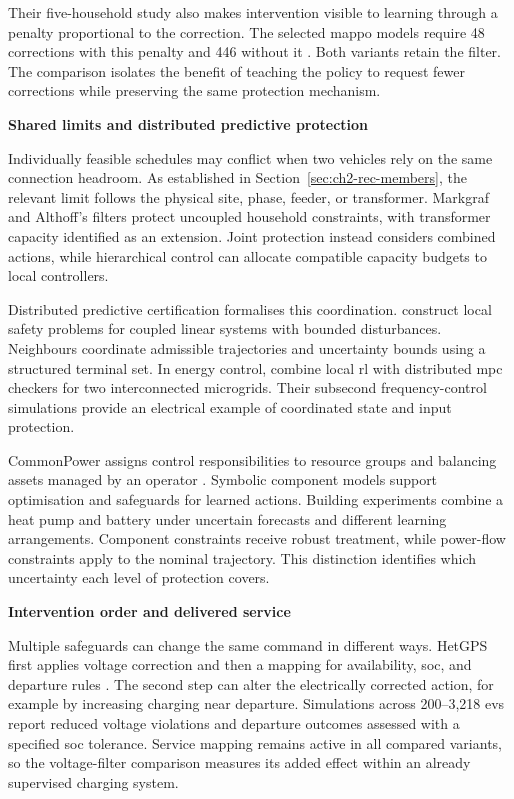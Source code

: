 Their five-household study also makes intervention visible to learning through a penalty proportional to the correction. The selected \gls{mappo} models require 48 corrections with this penalty and 446 without it \parencite{markgraf2023safedr}. Both variants retain the filter. The comparison isolates the benefit of teaching the policy to request fewer corrections while preserving the same protection mechanism.

\smallskip
\noindent\textbf{Shared limits and distributed predictive protection}\par\nobreak\smallskip
Individually feasible schedules may conflict when two vehicles rely on the same connection headroom. As established in Section~\ref{sec:ch2-rec-members}, the relevant limit follows the physical site, phase, feeder, or transformer. Markgraf and Althoff's filters protect uncoupled household constraints, with transformer capacity identified as an extension. Joint protection instead considers combined actions, while hierarchical control can allocate compatible capacity budgets to local controllers.

Distributed predictive certification formalises this coordination. \textcite{muntwiler2020distributed} construct local safety problems for coupled linear systems with bounded disturbances. Neighbours coordinate admissible trajectories and uncertainty bounds using a structured terminal set. In energy control, \textcite{tao2025distributed} combine local \gls{rl} with distributed \gls{mpc} checkers for two interconnected microgrids. Their subsecond frequency-control simulations provide an electrical example of coordinated state and input protection.

CommonPower assigns control responsibilities to resource groups and balancing assets managed by an operator \parencite{eichelbeck2026commonpower}. Symbolic component models support optimisation and safeguards for learned actions. Building experiments combine a heat pump and battery under uncertain forecasts and different learning arrangements. Component constraints receive robust treatment, while power-flow constraints apply to the nominal trajectory. This distinction identifies which uncertainty each level of protection covers.

\smallskip
\noindent\textbf{Intervention order and delivered service}\par\nobreak\smallskip
Multiple safeguards can change the same command in different ways. HetGPS first applies voltage correction and then a mapping for availability, \gls{soc}, and departure rules \parencite{wang2026hetgps}. The second step can alter the electrically corrected action, for example by increasing charging near departure. Simulations across 200--3,218 \glspl{ev} report reduced voltage violations and departure outcomes assessed with a specified \gls{soc} tolerance. Service mapping remains active in all compared variants, so the voltage-filter comparison measures its added effect within an already supervised charging system.

